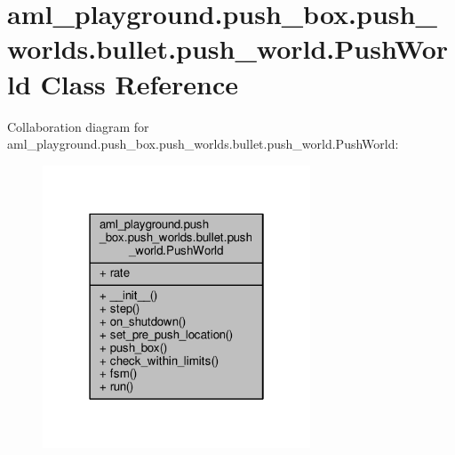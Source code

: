 \hypertarget{classaml__playground_1_1push__box_1_1push__worlds_1_1bullet_1_1push__world_1_1_push_world}{\section{aml\-\_\-playground.\-push\-\_\-box.\-push\-\_\-worlds.\-bullet.\-push\-\_\-world.\-Push\-World Class Reference}
\label{classaml__playground_1_1push__box_1_1push__worlds_1_1bullet_1_1push__world_1_1_push_world}
}


Collaboration diagram for aml\-\_\-playground.\-push\-\_\-box.\-push\-\_\-worlds.\-bullet.\-push\-\_\-world.\-Push\-World\-:\nopagebreak
\begin{figure}[H]
\begin{center}
\leavevmode
\includegraphics[width=226pt]{classaml__playground_1_1push__box_1_1push__worlds_1_1bullet_1_1push__world_1_1_push_world__coll__graph}
\end{center}
\end{figure}
